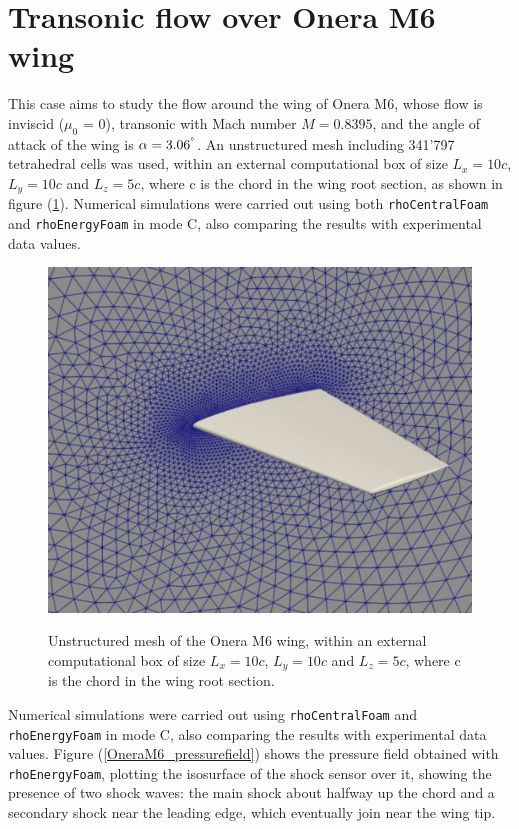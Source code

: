 \documentclass[a5paper]{sapthesis}
\begin{document}
	\section{Transonic flow over Onera M6 wing}
	This case aims to study the flow around the wing of Onera M6, whose flow is inviscid ($\mu_0$ = 0), transonic with Mach number $M = 0.8395$, and the angle of attack of the wing is $\alpha = 3.06^{\textrm{\upshape\textdegree}}$. An unstructured mesh including 341'797 tetrahedral cells was used, within an external computational box of size $L_x = 10c$, $L_y = 10c$ and $L_z = 5c$, where c is the chord in the wing root section, as shown in figure (\ref{OneraM6_mesh}). Numerical simulations were carried out using both \texttt{rhoCentralFoam} and \texttt{rhoEnergyFoam} in mode C, also comparing the results with experimental data values.
	
	\begin{figure}[h]
		\centering
		{\includegraphics[width=0.6\linewidth]{Figures/OneraM6mesh}}  
		\caption[Unstructured mesh of the Onera M6 wing]{Unstructured mesh of the Onera M6 wing, within an external computational box of size $L_x = 10c$, $L_y = 10c$ and $L_z = 5c$, where c is the chord in the wing root section.}
		\label{OneraM6_mesh}
	\end{figure}
	
	\noindent Numerical simulations were carried out using \texttt{rhoCentralFoam} and \texttt{rhoEnergyFoam} in mode C, also comparing the results with experimental data values. Figure (\ref{OneraM6_pressurefield}) shows the pressure field obtained with \texttt{rhoEnergyFoam}, plotting the isosurface of the shock sensor over it, showing the presence of two shock waves: the main shock about halfway up the chord and a secondary shock near the leading edge, which eventually join near the wing tip.
	
\end{document}
